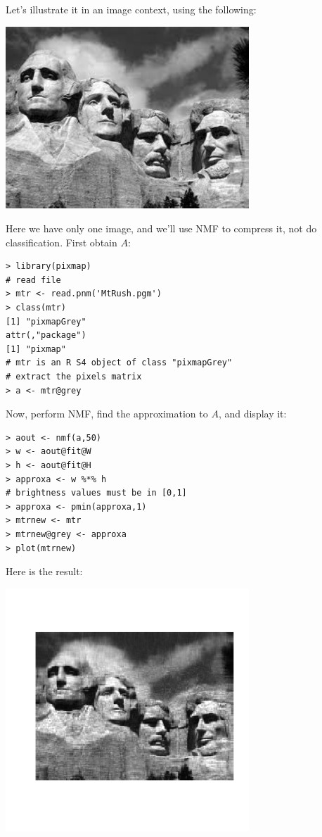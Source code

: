 Let's illustrate it in an image context, using the following:

\includegraphics[width=3.6in]{Images/MtRush.png}

Here we have only one image, and we'll use NMF to compress it, not do
classification.  First obtain $A$:

\begin{lstlisting}
> library(pixmap) 
# read file
> mtr <- read.pnm('MtRush.pgm') 
> class(mtr)
[1] "pixmapGrey"
attr(,"package")
[1] "pixmap"
# mtr is an R S4 object of class "pixmapGrey"
# extract the pixels matrix
> a <- mtr@grey
\end{lstlisting}

Now, perform NMF, find the approximation to $A$, and display it:

\begin{lstlisting}
> aout <- nmf(a,50)
> w <- aout@fit@W
> h <- aout@fit@H
> approxa <- w %*% h
# brightness values must be in [0,1]
> approxa <- pmin(approxa,1) 
> mtrnew <- mtr
> mtrnew@grey <- approxa 
> plot(mtrnew) 
\end{lstlisting}

Here is the result:

\includegraphics[width=3.6in]{Images/MtRush50.png}

